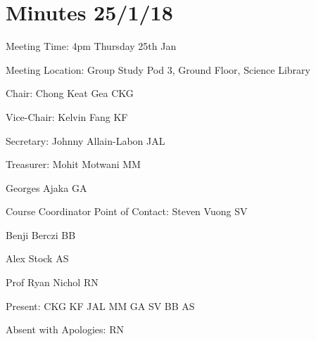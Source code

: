 \noindent 
\section{Minutes 25/1/18}\label{app:25-1}

\noindent Meeting Time: 4pm Thursday 25th Jan

\noindent Meeting Location: Group Study Pod 3, Ground Floor, Science Library\textbf{}\\

\noindent 

\noindent \textbf{}

\noindent Chair: Chong Keat Gea CKG

\noindent Vice-Chair: Kelvin Fang KF

\noindent Secretary: Johnny Allain-Labon JAL

\noindent Treasurer: Mohit Motwani MM

\noindent Georges Ajaka GA

\noindent Course Coordinator Point of Contact: Steven Vuong SV

\noindent Benji Berczi BB

\noindent Alex Stock AS

\noindent Prof Ryan Nichol RN

\noindent 

\noindent Present: CKG KF JAL MM GA SV BB AS

\noindent Absent with Apologies: RN\\

\noindent 

